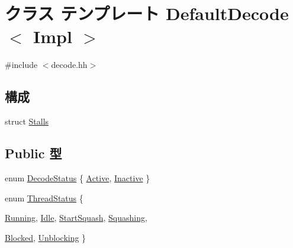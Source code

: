 \hypertarget{classDefaultDecode}{
\section{クラス テンプレート DefaultDecode$<$ Impl $>$}
\label{classDefaultDecode}
}


{\ttfamily \#include $<$decode.hh$>$}\subsection*{構成}
\begin{DoxyCompactItemize}
\item 
struct \hyperlink{structDefaultDecode_1_1Stalls}{Stalls}
\end{DoxyCompactItemize}
\subsection*{Public 型}
\begin{DoxyCompactItemize}
\item 
enum \hyperlink{classDefaultDecode_a92cfc320e0bf43339d34c50c65be3d71}{DecodeStatus} \{ \hyperlink{classDefaultDecode_a92cfc320e0bf43339d34c50c65be3d71a26bd8444261cc58df7a86753c79d2520}{Active}, 
\hyperlink{classDefaultDecode_a92cfc320e0bf43339d34c50c65be3d71a969c924a722daf6334fca64346092ae6}{Inactive}
 \}
\item 
enum \hyperlink{classDefaultDecode_ae2739961013a00cede621d4d72f2173c}{ThreadStatus} \{ \par
\hyperlink{classDefaultDecode_ae2739961013a00cede621d4d72f2173ca2f5f2c4a8c4f4f0519d503dcdfbf55cb}{Running}, 
\hyperlink{classDefaultDecode_ae2739961013a00cede621d4d72f2173cad3fa9ae9431d6cb1772f9d9df48cab19}{Idle}, 
\hyperlink{classDefaultDecode_ae2739961013a00cede621d4d72f2173ca19a48e232b72697e4bb7ea1b6075ed49}{StartSquash}, 
\hyperlink{classDefaultDecode_ae2739961013a00cede621d4d72f2173ca22a648855197e326dc88f548634c0ec7}{Squashing}, 
\par
\hyperlink{classDefaultDecode_ae2739961013a00cede621d4d72f2173ca9463ee9b8700258a1019b4b9d2d77a30}{Blocked}, 
\hyperlink{classDefaultDecode_ae2739961013a00cede621d4d72f2173caf2a3acf850890cb1651bc41dcbacb7e0}{Unblocking}
 \}
\end{DoxyCompactItemize}
